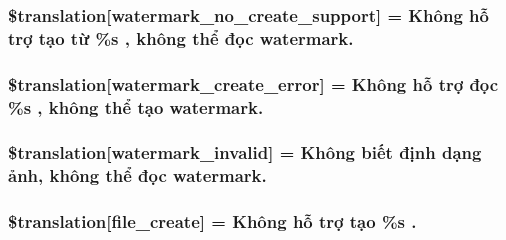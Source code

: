 \subsubsection[{\$translation}]{\setlength{\rightskip}{0pt plus 5cm}\$translation\mbox{[}\textquotesingle{}watermark\+\_\+no\+\_\+create\+\_\+support\textquotesingle{}\mbox{]} = \textquotesingle{}Không hỗ trợ tạo từ \%s , không thể đọc watermark.\textquotesingle{}}\label{class_8upload_8vn___v_n_8php_a82d5853430ab72dc1f9799ec36144cc6}
\hypertarget{class_8upload_8vn___v_n_8php_aabca0b65dadbc6184415c16375f284ca}{}
\subsubsection[{\$translation}]{\setlength{\rightskip}{0pt plus 5cm}\$translation\mbox{[}\textquotesingle{}watermark\+\_\+create\+\_\+error\textquotesingle{}\mbox{]} = \textquotesingle{}Không hỗ trợ đọc \%s , không thể tạo watermark.\textquotesingle{}}\label{class_8upload_8vn___v_n_8php_aabca0b65dadbc6184415c16375f284ca}
\hypertarget{class_8upload_8vn___v_n_8php_ac336e7a5701e47ba4a05e9e498a3cc44}{}
\subsubsection[{\$translation}]{\setlength{\rightskip}{0pt plus 5cm}\$translation\mbox{[}\textquotesingle{}watermark\+\_\+invalid\textquotesingle{}\mbox{]} = \textquotesingle{}Không biết định dạng ảnh, không thể đọc watermark.\textquotesingle{}}\label{class_8upload_8vn___v_n_8php_ac336e7a5701e47ba4a05e9e498a3cc44}
\hypertarget{class_8upload_8vn___v_n_8php_a1ecb4673e4fb69e06b3f20b65cecf30a}{}
\subsubsection[{\$translation}]{\setlength{\rightskip}{0pt plus 5cm}\$translation\mbox{[}\textquotesingle{}file\+\_\+create\textquotesingle{}\mbox{]} = \textquotesingle{}Không hỗ trợ tạo \%s .\textquotesingle{}}\label{class_8upload_8vn___v_n_8php_a1ecb4673e4fb69e06b3f20b65cecf30a}
\hypertarget{class_8upload_8vn___v_n_8php_a4712d7ec28e9a7f17eb3338af2358363}{}
